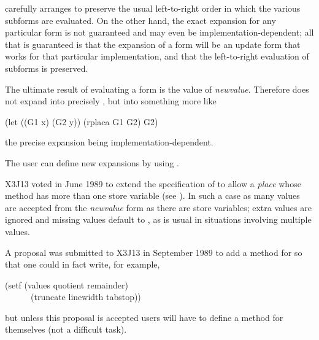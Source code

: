 \begin{defmac}
 carefully arranges to preserve the usual left-to-right
order in which the various subforms are evaluated.
On the other hand,
the exact expansion for any particular form is not guaranteed and
may even be implementation-dependent; all that is guaranteed is that
the expansion of a  form will be an update form that works
for that particular implementation, and that the left-to-right evaluation
of subforms is preserved.

The ultimate result of evaluating a  form is the value
of \emph{newvalue}.  Therefore  does not expand
into precisely , but into something more like
\begin{lisp}
(let ((G1 x) (G2 y)) (rplaca G1 G2) G2)
\end{lisp}
the precise expansion being implementation-dependent.

The user can define new  expansions by using .

\begin{newer}
X3J13 voted in June 1989 
to extend the specification of  to allow a \emph{place}
whose  method has more than one store variable (see ).
In such a case as many values are accepted from the \emph{newvalue} form
as there are store variables; extra values are ignored
and missing values default to ,
as is usual in situations involving multiple values.

A proposal was submitted to X3J13 in September 1989
to add a  method for  so that one could
in fact write, for example,
\begin{lisp}
(setf (values quotient remainder) \\
~~~~~~(truncate linewidth tabstop))
\end{lisp}
but unless this proposal is accepted users will have to
define a  method for  themselves (not a difficult task).
\end{newer}
\end{defmac}


